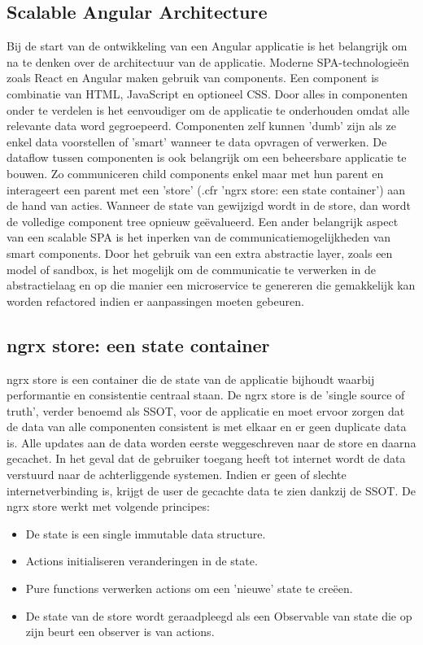 \subsection{Scalable Angular Architecture}
Bij de start van de ontwikkeling van een Angular applicatie is het belangrijk om na te denken over de architectuur van de applicatie. Moderne SPA-technologie\"en zoals React en Angular maken gebruik van components. Een component is combinatie van HTML, JavaScript en optioneel CSS. Door alles in componenten onder te verdelen is het eenvoudiger om de applicatie te onderhouden omdat alle relevante data word gegroepeerd. Componenten zelf kunnen 'dumb' zijn als ze enkel data voorstellen of 'smart' wanneer te data opvragen of verwerken.
De dataflow tussen componenten is ook belangrijk om een beheersbare applicatie te bouwen. Zo communiceren child components enkel maar met hun parent en interageert een parent met een 'store' (.cfr 'ngrx store: een state container') aan de hand van acties. Wanneer de state van gewijzigd wordt in de store, dan wordt de volledige component tree opnieuw ge\"evalueerd. Een ander belangrijk aspect van een scalable SPA is het inperken van de communicatiemogelijkheden van smart components. Door het gebruik van een extra abstractie layer, zoals een model of sandbox, is het mogelijk om de communicatie te verwerken in de abstractielaag en op die manier een microservice te genereren die gemakkelijk kan worden refactored indien er aanpassingen moeten gebeuren.
\subsection{ngrx store: een state container}
ngrx store is een container die de state van de applicatie bijhoudt waarbij performantie en consistentie centraal staan. De ngrx store is de 'single source of truth', verder benoemd als SSOT, voor de applicatie en moet ervoor zorgen dat de data van alle componenten consistent is met elkaar en er geen duplicate data is. Alle updates aan de data worden eerste weggeschreven naar de store en daarna gecachet. In het geval dat de gebruiker toegang heeft tot internet wordt de data verstuurd naar de achterliggende systemen. Indien er geen of slechte internetverbinding is, krijgt de user de gecachte data te zien dankzij de SSOT. De ngrx store werkt met volgende principes:
\begin{itemize}  
\item De state is een single immutable data structure.
\item Actions initialiseren veranderingen in de state.
\item Pure functions verwerken actions om een 'nieuwe' state te cre\"een.
\item De state van de store wordt geraadpleegd als een Observable van state die op zijn beurt een observer is van actions.
\end{itemize}
